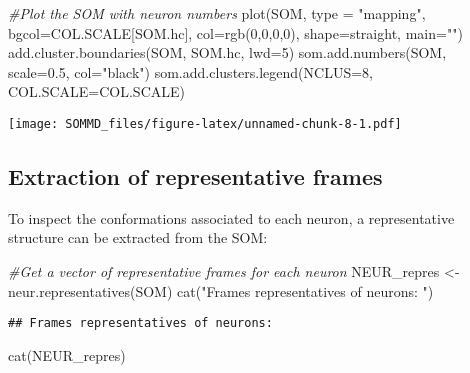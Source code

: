 \documentclass[
]{article}
\newenvironment{Shaded}{\begin{snugshade}}{\end{snugshade}}
\newcommand{\AttributeTok}[1]{\textcolor[rgb]{0.77,0.63,0.00}{#1}}
\newcommand{\CommentTok}[1]{\textcolor[rgb]{0.56,0.35,0.01}{\textit{#1}}}
\newcommand{\DecValTok}[1]{\textcolor[rgb]{0.00,0.00,0.81}{#1}}
\newcommand{\FloatTok}[1]{\textcolor[rgb]{0.00,0.00,0.81}{#1}}
\newcommand{\FunctionTok}[1]{\textcolor[rgb]{0.00,0.00,0.00}{#1}}
\newcommand{\NormalTok}[1]{#1}
\newcommand{\OtherTok}[1]{\textcolor[rgb]{0.56,0.35,0.01}{#1}}
\newcommand{\StringTok}[1]{\textcolor[rgb]{0.31,0.60,0.02}{#1}}
\begin{document}
\begin{Shaded}
\begin{Highlighting}[]
\CommentTok{\#Plot the SOM with neuron numbers}
\FunctionTok{plot}\NormalTok{(SOM, }\AttributeTok{type =} \StringTok{"mapping"}\NormalTok{, }\AttributeTok{bgcol=}\NormalTok{COL.SCALE[SOM.hc], }\AttributeTok{col=}\FunctionTok{rgb}\NormalTok{(}\DecValTok{0}\NormalTok{,}\DecValTok{0}\NormalTok{,}\DecValTok{0}\NormalTok{,}\DecValTok{0}\NormalTok{), }\AttributeTok{shape=}\StringTok{\textquotesingle{}straight\textquotesingle{}}\NormalTok{, }\AttributeTok{main=}\StringTok{""}\NormalTok{)}
\FunctionTok{add.cluster.boundaries}\NormalTok{(SOM, SOM.hc, }\AttributeTok{lwd=}\DecValTok{5}\NormalTok{)}
\FunctionTok{som.add.numbers}\NormalTok{(SOM, }\AttributeTok{scale=}\FloatTok{0.5}\NormalTok{, }\AttributeTok{col=}\StringTok{"black"}\NormalTok{)}
\FunctionTok{som.add.clusters.legend}\NormalTok{(}\AttributeTok{NCLUS=}\DecValTok{8}\NormalTok{, }\AttributeTok{COL.SCALE=}\NormalTok{COL.SCALE)}
\end{Highlighting}
\end{Shaded}

\texttt{[image: SOMMD\_files/figure-latex/unnamed-chunk-8-1.pdf]}

\hypertarget{extraction-of-representative-frames}{%
\subsection{Extraction of representative
frames}\label{extraction-of-representative-frames}}

To inspect the conformations associated to each neuron, a representative
structure can be extracted from the SOM:

\begin{Shaded}
\begin{Highlighting}[]
\CommentTok{\#Get a vector of representative frames for each neuron}
\NormalTok{NEUR\_repres }\OtherTok{\textless{}{-}} \FunctionTok{neur.representatives}\NormalTok{(SOM)}
\FunctionTok{cat}\NormalTok{(}\StringTok{"Frames representatives of neurons: "}\NormalTok{)}
\end{Highlighting}
\end{Shaded}

\begin{verbatim}
## Frames representatives of neurons:
\end{verbatim}

\begin{Shaded}
\begin{Highlighting}[]
\FunctionTok{cat}\NormalTok{(NEUR\_repres)}
\end{Highlighting}
\end{Shaded}
\end{document}
